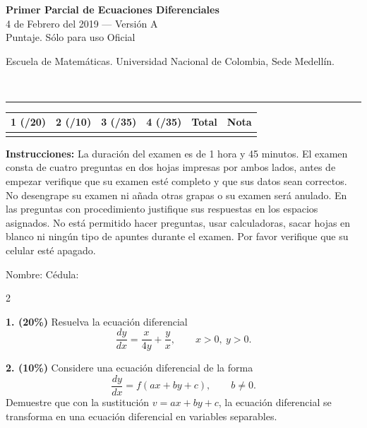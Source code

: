 \documentclass[11pt]{article}
\begin{document}
\noindent
\begin{minipage}[t]{0.62\linewidth}
  {\bfseries\large Primer Parcial de Ecuaciones Diferenciales}\\[2pt]
  {\small 4 de Febrero del 2019 --- Versión A}\\
  {\small Puntaje. Sólo para uso Oficial}
\end{minipage}%
\hfill
\begin{minipage}[t]{0.35\linewidth}
  \raggedleft\small Escuela de Matemáticas. Universidad Nacional de Colombia, Sede Medellín.
\end{minipage}\\[4pt]
\rule{\linewidth}{0.6pt}

\vspace{4pt}
\noindent
\begin{tabular}{|c|c|c|c|c|c|}
\hline
1 (/20) & 2 (/10) & 3 (/35) & 4 (/35) & Total & Nota \\
\hline
 & & & & & \\
\hline
\end{tabular}

\vspace{6pt}
\noindent\textbf{Instrucciones:} La duración del examen es de 1 hora y 45 minutos. El examen consta de cuatro preguntas en dos hojas impresas por ambos lados, antes de empezar verifique que su examen esté completo y que sus datos sean correctos. No desengrape su examen ni añada otras grapas o su examen será anulado. En las preguntas con procedimiento justifique sus respuestas en los espacios asignados. No está permitido hacer preguntas, usar calculadoras, sacar hojas en blanco ni ningún tipo de apuntes durante el examen. Por favor verifique que su celular esté apagado.

\vspace{8pt}
\noindent Nombre: \makebox[0.45\linewidth]{\hrulefill} \hfill Cédula: \makebox[0.3\linewidth]{\hrulefill}

\begin{multicols}{2}

\textbf{1. (20\%)} Resuelva la ecuación diferencial
\[
\frac{dy}{dx}=\frac{x}{4y}+\frac{y}{x}, \qquad x>0,\ y>0.
\]

\vspace{5cm}

\columnbreak

\textbf{2. (10\%)} Considere una ecuación diferencial de la forma
\[
\frac{dy}{dx}=f(ax+by+c), \qquad b\neq 0.
\]
Demuestre que con la sustitución $v=ax+by+c$, la ecuación diferencial se transforma en una ecuación diferencial en variables separables.

\end{multicols}
\end{document}
